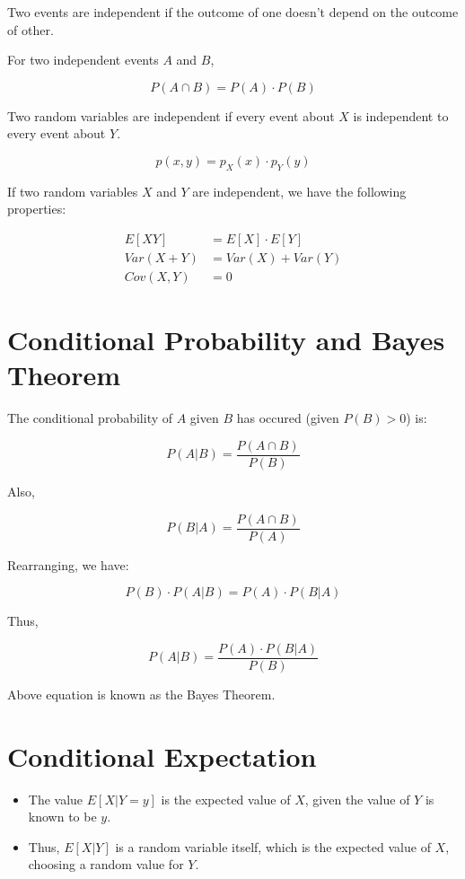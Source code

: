 \documentclass[twoside]{article}
\begin{document}
Two events are independent if the outcome of one doesn't depend on the outcome of other.

For two independent events $A$ and $B$,

\[
   P(A \cap B) = P(A) \cdot P(B)
\]

Two random variables are independent if every event about $X$ is independent to every event about $Y$.

\[
   p(x, y) = p_X(x) \cdot p_Y(y)
\]

If two random variables $X$ and $Y$ are independent, we have the following properties:

\begin{align*}
   E[XY] &= E[X] \cdot E[Y] \\
   Var(X+Y) &= Var(X) + Var(Y) \\
   Cov(X, Y) &= 0
\end{align*}

\section{Conditional Probability and Bayes Theorem}

The conditional probability of $A$ given $B$ has occured (given $P(B) > 0$) is:

\[
   P(A | B) = \frac{P(A \cap B)}{P(B)}
\]

Also,

\[
   P(B | A) = \frac{P(A \cap B)}{P(A)}
\]

Rearranging, we have:

\[
   P(B) \cdot P(A | B) = P(A) \cdot P(B | A)
\]

Thus,

\[
   P(A | B) = \frac{P(A) \cdot P(B|A)}{P(B)}
\]

Above equation is known as the Bayes Theorem.

\section{Conditional Expectation}

\begin{itemize}
   \item The value $E[X | Y=y]$ is the expected value of $X$, given the value of $Y$ is known to be $y$.
   \item Thus, $E[X|Y]$ is a random variable itself, which is the expected value of $X$, choosing a random value for $Y$.
\end{itemize}
\end{document}
